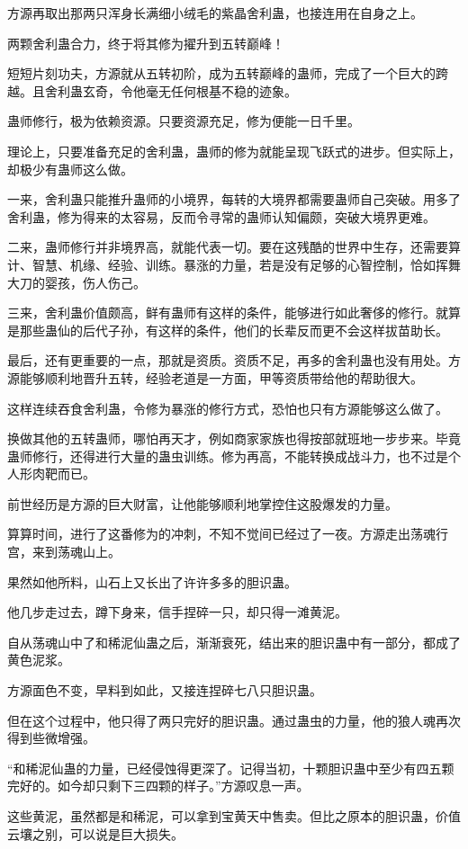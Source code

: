 \begin{this_body}
方源再取出那两只浑身长满细小绒毛的紫晶舍利蛊，也接连用在自身之上。

两颗舍利蛊合力，终于将其修为擢升到五转巅峰！

短短片刻功夫，方源就从五转初阶，成为五转巅峰的蛊师，完成了一个巨大的跨越。且舍利蛊玄奇，令他毫无任何根基不稳的迹象。

蛊师修行，极为依赖资源。只要资源充足，修为便能一日千里。

理论上，只要准备充足的舍利蛊，蛊师的修为就能呈现飞跃式的进步。但实际上，却极少有蛊师这么做。

一来，舍利蛊只能推升蛊师的小境界，每转的大境界都需要蛊师自己突破。用多了舍利蛊，修为得来的太容易，反而令寻常的蛊师认知偏颇，突破大境界更难。

二来，蛊师修行并非境界高，就能代表一切。要在这残酷的世界中生存，还需要算计、智慧、机缘、经验、训练。暴涨的力量，若是没有足够的心智控制，恰如挥舞大刀的婴孩，伤人伤己。

三来，舍利蛊价值颇高，鲜有蛊师有这样的条件，能够进行如此奢侈的修行。就算是那些蛊仙的后代子孙，有这样的条件，他们的长辈反而更不会这样拔苗助长。

最后，还有更重要的一点，那就是资质。资质不足，再多的舍利蛊也没有用处。方源能够顺利地晋升五转，经验老道是一方面，甲等资质带给他的帮助很大。

这样连续吞食舍利蛊，令修为暴涨的修行方式，恐怕也只有方源能够这么做了。

换做其他的五转蛊师，哪怕再天才，例如商家家族也得按部就班地一步步来。毕竟蛊师修行，还得进行大量的蛊虫训练。修为再高，不能转换成战斗力，也不过是个人形肉靶而已。

前世经历是方源的巨大财富，让他能够顺利地掌控住这股爆发的力量。

算算时间，进行了这番修为的冲刺，不知不觉间已经过了一夜。方源走出荡魂行宫，来到荡魂山上。

果然如他所料，山石上又长出了许许多多的胆识蛊。

他几步走过去，蹲下身来，信手捏碎一只，却只得一滩黄泥。

自从荡魂山中了和稀泥仙蛊之后，渐渐衰死，结出来的胆识蛊中有一部分，都成了黄色泥浆。

方源面色不变，早料到如此，又接连捏碎七八只胆识蛊。

但在这个过程中，他只得了两只完好的胆识蛊。通过蛊虫的力量，他的狼人魂再次得到些微增强。

“和稀泥仙蛊的力量，已经侵蚀得更深了。记得当初，十颗胆识蛊中至少有四五颗完好的。如今却只剩下三四颗的样子。”方源叹息一声。

这些黄泥，虽然都是和稀泥，可以拿到宝黄天中售卖。但比之原本的胆识蛊，价值云壤之别，可以说是巨大损失。


\end{this_body}
